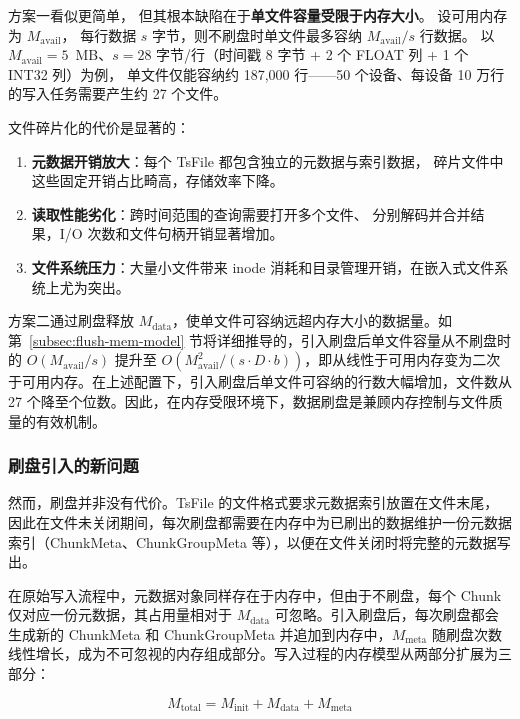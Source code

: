 方案一看似更简单，
但其根本缺陷在于\textbf{单文件容量受限于内存大小}。
设可用内存为 $M_{\text{avail}}$，
每行数据 $s$ 字节，则不刷盘时单文件最多容纳 
$M_{\text{avail}} / s$ 行数据。
以 $M_{\text{avail}} = 5$~MB、$s = 28$ 字节/行（时间戳 8 字节 + 2 个 FLOAT 列 + 1 个 INT32 列）为例，
单文件仅能容纳约 187,000 行——50 个设备、每设备 10 万行的写入任务需要产生约 27 个文件。

文件碎片化的代价是显著的：

\begin{enumerate}
  \item \textbf{元数据开销放大}：每个 TsFile 都包含独立的元数据与索引数据， 
  碎片文件中这些固定开销占比畸高，存储效率下降。
  \item \textbf{读取性能劣化}：跨时间范围的查询需要打开多个文件、
  分别解码并合并结果，I/O 次数和文件句柄开销显著增加。
  \item \textbf{文件系统压力}：大量小文件带来 inode 
  消耗和目录管理开销，在嵌入式文件系统上尤为突出。
\end{enumerate}

方案二通过刷盘释放 $M_{\text{data}}$，使单文件可容纳远超内存大小的数据量。如第~\ref{subsec:flush-mem-model} 节将详细推导的，引入刷盘后单文件容量从不刷盘时的 $O(M_{\text{avail}} / s)$ 提升至 $O(M_{\text{avail}}^2 / (s \cdot D \cdot b))$，即从线性于可用内存变为二次于可用内存。在上述配置下，引入刷盘后单文件可容纳的行数大幅增加，文件数从 27 个降至个位数。因此，在内存受限环境下，数据刷盘是兼顾内存控制与文件质量的有效机制。

\subsubsection{刷盘引入的新问题}

然而，刷盘并非没有代价。TsFile 的文件格式要求元数据索引放置在文件末尾，因此在文件未关闭期间，每次刷盘都需要在内存中为已刷出的数据维护一份元数据索引（ChunkMeta、ChunkGroupMeta 等），以便在文件关闭时将完整的元数据写出。

在原始写入流程中，元数据对象同样存在于内存中，但由于不刷盘，每个 Chunk 仅对应一份元数据，其占用量相对于 $M_{\text{data}}$ 可忽略。引入刷盘后，每次刷盘都会生成新的 ChunkMeta 和 ChunkGroupMeta 并追加到内存中，$M_{\text{meta}}$ 随刷盘次数线性增长，成为不可忽视的内存组成部分。写入过程的内存模型从两部分扩展为三部分：

\begin{equation}
  M_{\text{total}} = M_{\text{init}} + M_{\text{data}} + M_{\text{meta}}
  \label{eq:mem-total}
\end{equation}


